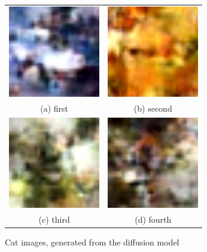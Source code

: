\documentclass[conference]{IEEEtran}
\begin{document}
    \begin{figure}
      \begin{tabular}{cc}
        \includegraphics[width=40mm]{./images/generated-imgs-cosine/cat/0306.png} 
    &   \includegraphics[width=40mm]{./images/generated-imgs-cosine/cat/0307.png} 
    \\
      (a) first 
      & (b) second \\[6pt]
         \includegraphics[width=40mm]{./images/generated-imgs-cosine/cat/0308.png} 
      &  \includegraphics[width=40mm]{./images/generated-imgs-cosine/cat/0309.png} 
    \\
      (c) third & (d) fourth \\[6pt]
      \end{tabular}
      \caption{Cat images, generated from the diffusion model}
      \end{figure}
  
\end{document}
